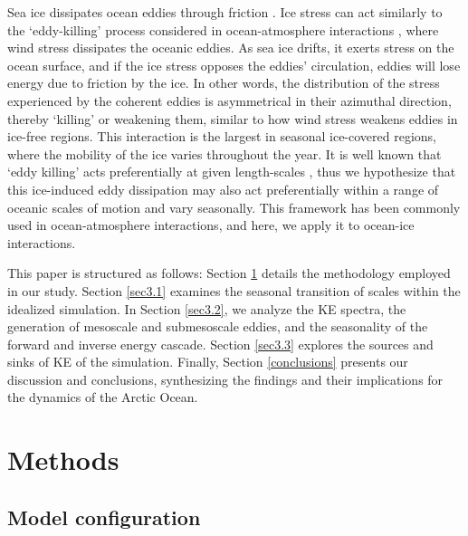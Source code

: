 \documentclass[draft]{agujournal2019}
\begin{document}
Sea ice dissipates ocean eddies through friction \citep{Ou_dissipation_1986}.  
Ice stress can act similarly to the `eddy-killing' process considered in ocean-atmosphere interactions \citep{Renault_eddy_killing_2016}, where wind stress dissipates the oceanic eddies. As sea ice drifts, it exerts stress on the ocean surface, and if the ice stress opposes the eddies' circulation, eddies will lose energy due to friction by the ice. In other words, the distribution of the stress experienced by the coherent eddies is asymmetrical in their azimuthal direction, thereby `killing' or weakening them, similar to how wind stress weakens eddies in ice-free regions. This interaction is the largest in seasonal ice-covered regions, where the mobility of the ice varies throughout the year. It is well known that `eddy killing' acts preferentially at given length-scales \citep{Rai_eddy_killing_2021}, thus we hypothesize that this ice-induced eddy dissipation may also act preferentially within a range of oceanic scales of motion and vary seasonally. This framework has been commonly used in ocean-atmosphere interactions, and here, we apply it to ocean-ice interactions.

This paper is structured as follows: Section \ref{Methods} details the methodology employed in our study. Section \ref{sec3.1} examines the seasonal transition of scales within the idealized simulation. In Section \ref{sec3.2}, we analyze the KE spectra, the generation of mesoscale and submesoscale eddies, and the seasonality of the forward and inverse energy cascade. Section \ref{sec3.3} explores the sources and sinks of KE of the simulation. Finally, Section \ref{conclusions} presents our discussion and conclusions, synthesizing the findings and their implications for the dynamics of the Arctic Ocean.

\section{Methods}
\label{Methods}

\subsection{Model configuration} \label{Model}
\end{document}
